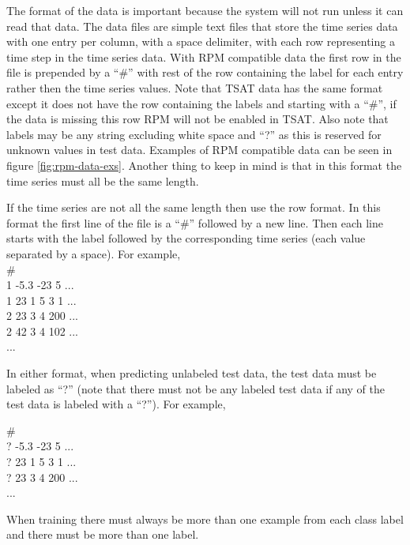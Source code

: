 \documentclass[letterpaper, 12pt]{article}
\newenvironment{allintypewriter}{\ttfamily}{\par}
\begin{document}
The format of the data is important because the system will not run unless it can read that data. The data files are simple text files that store the time series data with one entry per column, with a space delimiter, with each row representing a time step in the time series data. With RPM compatible data the first row in the file is prepended by a ``\#'' with rest of the row containing the label for each entry rather then the time series values. Note that TSAT data has the same format except it does not have the row containing the labels and starting with a ``\#'', if the data is missing this row RPM will not be enabled in TSAT. Also note that labels may be any string excluding white space and ``?'' as this is reserved for unknown values in test data. Examples of RPM compatible data can be seen in figure \ref{fig:rpm-data-exs}.  Another thing to keep in mind is that in this format the time series must all be the same length.

If the time series are not all the same length then use the row format.  In this format the first line of the file is a ``\#'' followed by a new line.  Then each line starts with the label followed by the corresponding time series (each value separated by a space).  For example,\\
\begin{allintypewriter}
	\noindent\#\\
	1 -5.3 -23 5 ...\\
	1 23 1 5 3 1 ...\\
	2 23 3 4 200 ...\\
	2 42 3 4 102 ...\\
	...
\end{allintypewriter}

In either format, when predicting unlabeled test data, the test data must be labeled as ``?'' (note that there must not be any labeled test data if any of the test data is labeled with a ``?'').  For example,

\begin{allintypewriter}
	\noindent\#\\
	? -5.3 -23 5 ...\\
	? 23 1 5 3 1 ...\\
	? 23 3 4 200 ...\\
	...
\end{allintypewriter}

When training there must always be more than one example from each class label and there must be more than one label.

\newpage
\end{document}

